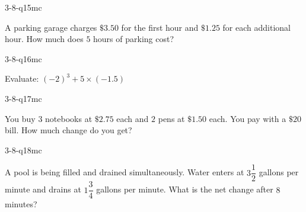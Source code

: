 \begin{practiceQuestion}{3-8-q15}{mc}
\begin{questionText}
A parking garage charges $\$3.50$ for the first hour and $\$1.25$ for each additional hour. How much does $5$ hours of parking cost?
\end{questionText}
\end{practiceQuestion}

\begin{practiceQuestion}{3-8-q16}{mc}
\begin{questionText}
Evaluate: $(-2)^3 + 5 \times (-1.5)$
\end{questionText}
\end{practiceQuestion}

\begin{practiceQuestion}{3-8-q17}{mc}
\begin{questionText}
You buy $3$ notebooks at $\$2.75$ each and $2$ pens at $\$1.50$ each. You pay with a $\$20$ bill. How much change do you get?
\end{questionText}
\end{practiceQuestion}

\begin{practiceQuestion}{3-8-q18}{mc}
\begin{questionText}
A pool is being filled and drained simultaneously. Water enters at $3\dfrac{1}{2}$ gallons per minute and drains at $1\dfrac{3}{4}$ gallons per minute. What is the net change after $8$ minutes?
\end{questionText}
\end{practiceQuestion}


